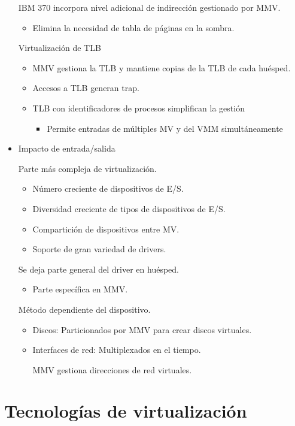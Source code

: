 \documentclass[12pt, twoside, openright]{report} %
\begin{document}
\begin{itemize}
    IBM 370 incorpora nivel adicional de indirección
gestionado por MMV.
\begin{itemize}
  \item Elimina la necesidad de tabla de páginas en la sombra.
\end{itemize}

Virtualización de TLB
\begin{itemize}
  \item MMV gestiona la TLB y mantiene copias de la TLB de cada
huésped.
  \item Accesos a TLB generan trap.
  \item TLB con identificadores de procesos simplifican la gestión
  \begin{itemize}
    \item Permite entradas de múltiples MV y del VMM
simultáneamente
  \end{itemize}
\end{itemize}
  \item Impacto de entrada/salida

  Parte más compleja de virtualización.
  \begin{itemize}
    \item Número creciente de dispositivos de E/S.
    \item Diversidad creciente de tipos de dispositivos de E/S.
    \item Compartición de dispositivos entre MV.
    \item Soporte de gran variedad de drivers.
  \end{itemize}


Se deja parte general del driver en huésped.
\begin{itemize}
    \item Parte específica en MMV.
  \end{itemize}

Método dependiente del dispositivo.
\begin{itemize}
    \item Discos: Particionados por MMV para crear discos
virtuales.
    \item Interfaces de red: Multiplexados en el tiempo.

MMV gestiona direcciones de red virtuales.
  \end{itemize}


\end{itemize}

\pagebreak
\section{Tecnologías de virtualización}
\end{document}
